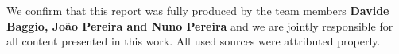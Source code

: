 \begin{center}
    We confirm that this report was fully produced by the team members \textbf{Davide Baggio, João Pereira and Nuno Pereira} and we are jointly responsible for all content presented in this work. All used sources were attributed properly.
    
\end{center}
